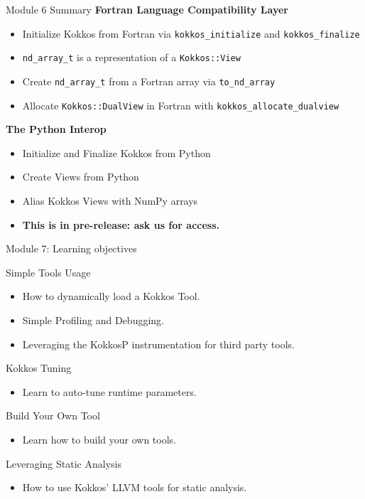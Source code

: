 \begin{frame}[fragile]{Module 6 Summary}
\textbf{Fortran Language Compatibility Layer}
\begin{itemize}
  \item Initialize Kokkos from Fortran via \texttt{kokkos\_initialize} and \texttt{kokkos\_finalize}
  \item \texttt{nd\_array\_t} is a representation of a \texttt{Kokkos::View}
  \item Create \texttt{nd\_array\_t} from a Fortran array via \texttt{to\_nd\_array}
  \item Allocate \texttt{Kokkos::DualView} in Fortran with \texttt{kokkos\_allocate\_dualview}
\end{itemize}


  \vspace{10pt}
  \textbf{The Python Interop}
  \begin{itemize}
    \item Initialize and Finalize Kokkos from Python
    \item Create Views from Python
    \item Alias Kokkos Views with NumPy arrays
    \item \textbf{This is in pre-release: ask us for access.}
  \end{itemize}
\end{frame}

\begin{frame}{Module 7: Learning objectives}
  \begin{block}{Simple Tools Usage}
    \begin{itemize}
    \item How to dynamically load a Kokkos Tool.
    \item Simple Profiling and Debugging.
    \item Leveraging the KokkosP instrumentation for third party tools.
  \end{itemize}
  \end{block}

  \begin{block}{Kokkos Tuning}
  \begin{itemize}
    \item Learn to auto-tune runtime parameters.
  \end{itemize}
  \end{block}

  \begin{block}{Build Your Own Tool}
  \begin{itemize}
    \item Learn how to build your own tools.
  \end{itemize}
  \end{block}

  \begin{block}{Leveraging Static Analysis}
  \begin{itemize}
    \item How to use Kokkos' LLVM tools for static analysis.
  \end{itemize}
  \end{block}
\end{frame}

